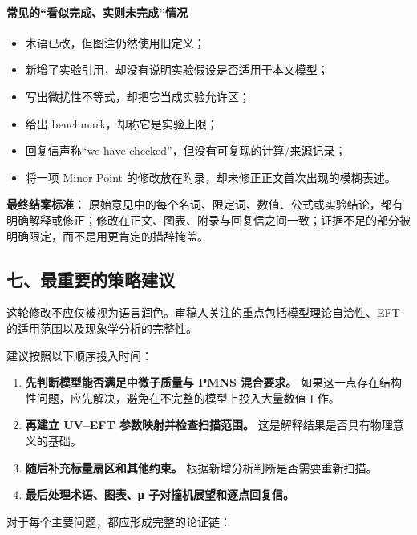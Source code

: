 \documentclass[
]{article}
\providecommand{\tightlist}{%
  \setlength{\itemsep}{0pt}\setlength{\parskip}{0pt}}
\begin{document}
\paragraph{常见的``看似完成、实则未完成''情况}\label{ux5e38ux89c1ux7684ux770bux4f3cux5b8cux6210ux5b9eux5219ux672aux5b8cux6210ux60c5ux51b5}

\begin{itemize}
\tightlist
\item
  术语已改，但图注仍然使用旧定义；
\item
  新增了实验引用，却没有说明实验假设是否适用于本文模型；
\item
  写出微扰性不等式，却把它当成实验允许区；
\item
  给出 benchmark，却称它是实验上限；
\item
  回复信声称``we have checked''，但没有可复现的计算/来源记录；
\item
  将一项 Minor Point 的修改放在附录，却未修正正文首次出现的模糊表述。
\end{itemize}

\textbf{最终结案标准：}
原始意见中的每个名词、限定词、数值、公式或实验结论，都有明确解释或修正；修改在正文、图表、附录与回复信之间一致；证据不足的部分被明确限定，而不是用更肯定的措辞掩盖。

\subsection{七、最重要的策略建议}\label{ux4e03ux6700ux91cdux8981ux7684ux7b56ux7565ux5efaux8bae}

这轮修改不应仅被视为语言润色。审稿人关注的重点包括模型理论自洽性、EFT
的适用范围以及现象学分析的完整性。

建议按照以下顺序投入时间：

\begin{enumerate}
\def\labelenumi{\arabic{enumi}.}
\tightlist
\item
  \textbf{先判断模型能否满足中微子质量与 PMNS 混合要求。}
  如果这一点存在结构性问题，应先解决，避免在不完整的模型上投入大量数值工作。
\item
  \textbf{再建立 UV--EFT 参数映射并检查扫描范围。}
  这是解释结果是否具有物理意义的基础。
\item
  \textbf{随后补充标量扇区和其他约束。}
  根据新增分析判断是否需要重新扫描。
\item
  \textbf{最后处理术语、图表、μ 子对撞机展望和逐点回复信。}
\end{enumerate}

对于每个主要问题，都应形成完整的论证链：
\end{document}
